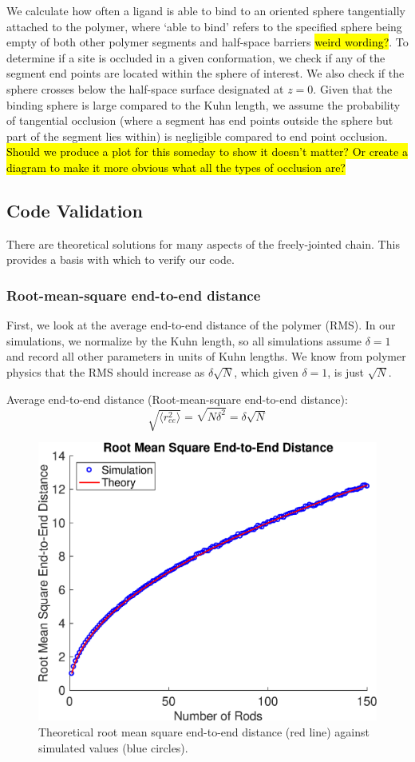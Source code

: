 \documentclass[../AdvancementSummary.tex]{subfiles}
\begin{document}
We calculate how often a ligand is able to bind to an oriented sphere tangentially attached to the polymer, where `able to bind' refers to the specified sphere being empty of both other polymer segments and half-space barriers \hl{weird wording?}. To determine if a site is occluded in a given conformation, we check if any of the segment end points are located within the sphere of interest. We also check if the sphere crosses below the half-space surface designated at $z=0$. Given that the binding sphere is large compared to the Kuhn length, we assume the probability of tangential occlusion (where a segment has end points outside the sphere but part of the segment lies within) is negligible compared to end point occlusion. \hl{Should we produce a plot for this someday to show it doesn't matter? Or create a diagram to make it more obvious what all the types of occlusion are?}


\subsection{Code Validation}
There are theoretical solutions for many aspects of the freely-jointed chain.  This provides a basis with which to verify our code.  

\subsubsection{Root-mean-square end-to-end distance}
First, we look at the average end-to-end distance of the polymer (RMS). In our simulations, we normalize by the Kuhn length, so all simulations assume $\delta = 1$ and record all other parameters in units of Kuhn lengths.  We know from polymer physics that the RMS should increase as $\delta \sqrt{N}$, which given $\delta = 1$, is just $\sqrt{N}$.

Average end-to-end distance (Root-mean-square end-to-end distance):  \cite{Reeves2011}
\begin{equation*}
\sqrt{\langle r_{ee}^2 \rangle} = \sqrt{N\delta^2} = \delta \sqrt{N}
\end{equation*}

\begin{figure}[H]
\begin{center}
\includegraphics[width=0.5\linewidth]{ModelConfirmationFigures/RMSEndtoEnd.eps}
\caption{Theoretical root mean square end-to-end distance (red line) against simulated values (blue circles). \label{fig: RMS}}
\end{center}
\end{figure}
\end{document}
